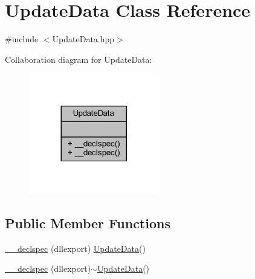 \hypertarget{class_update_data}{\section{Update\-Data Class Reference}
\label{class_update_data}
}


{\ttfamily \#include $<$Update\-Data.\-hpp$>$}



Collaboration diagram for Update\-Data\-:\nopagebreak
\begin{figure}[H]
\begin{center}
\leavevmode
\includegraphics[width=161pt]{class_update_data__coll__graph}
\end{center}
\end{figure}
\subsection*{Public Member Functions}
\begin{DoxyCompactItemize}
\item 
\hyperlink{class_update_data_a6c196ff72aceb015ce055e2bd807e73a}{\-\_\-\-\_\-declspec} (dllexport) \hyperlink{class_update_data}{Update\-Data}()
\item 
\hyperlink{class_update_data_a5c8ec8244a43c31e16d47e3fcc430a62}{\-\_\-\-\_\-declspec} (dllexport)$\sim$\hyperlink{class_update_data}{Update\-Data}()
\end{DoxyCompactItemize}


